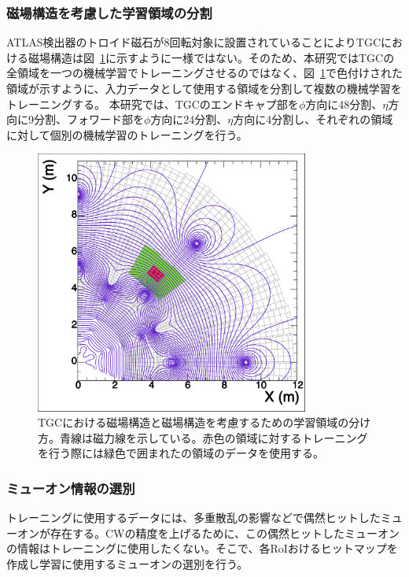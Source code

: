 \subsubsection{磁場構造を考慮した学習領域の分割}
ATLAS検出器のトロイド磁石が8回転対象に設置されていることによりTGCにおける磁場構造は図~\ref{fig:Mag}に示すように一様ではない。そのため、本研究ではTGCの全領域を一つの機械学習でトレーニングさせるのではなく、図~\ref{fig:Mag}で色付けされた領域が示すように、入力データとして使用する領域を分割して複数の機械学習をトレーニングする。
本研究では、TGCのエンドキャプ部を$\phi$方向に48分割、$\eta$方向に9分割、フォワード部を$\phi$方向に24分割、$\eta$方向に4分割し、それぞれの領域に対して個別の機械学習のトレーニングを行う。
\begin{figure}[tb]
  \centering
  \includegraphics[bb=2 3 555 540,clip, width=9cm]{fig/4/c1_withMag.pdf}
  \caption{TGCにおける磁場構造と磁場構造を考慮するための学習領域の分け方。青線は磁力線を示している。赤色の領域に対するトレーニングを行う際には緑色で囲まれたの領域のデータを使用する。}
  \label{fig:Mag}
\end{figure}

\subsubsection{ミューオン情報の選別}
トレーニングに使用するデータには、多重散乱の影響などで偶然ヒットしたミューオンが存在する。CWの精度を上げるために、この偶然ヒットしたミューオンの情報はトレーニングに使用したくない。そこで、各RoIおけるヒットマップを作成し学習に使用するミューオンの選別を行う。

